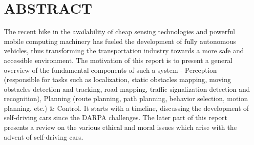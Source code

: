 \section{ABSTRACT}

The recent hike in the availability of cheap sensing technologies and powerful
mobile computing machinery has fueled the development of fully autonomous
vehicles, thus transforming the transportation industry towards a more safe and
accessible environment. The motivation of this report is to present a general
overview of the fundamental components of such a system - Perception
(responsible for tasks such as localization, static obstacles mapping, moving
obstacles detection and tracking, road mapping, traffic signalization detection
and recognition), Planning (route planning, path planning, behavior selection,
motion planning, etc.) \& Control. It starts with a timeline, discussing the
development of self-driving cars since the DARPA challenges. The later part of
this report presents a review on the various ethical and moral issues which
arise with the advent of self-driving cars.
